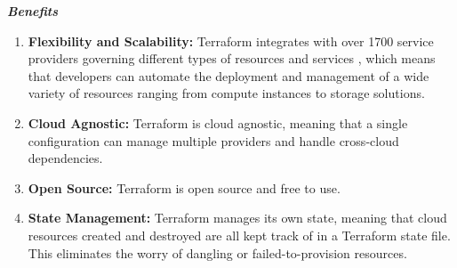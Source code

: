 \textbf{\textit{Benefits}}
\begin{enumerate}
\vspace{-1em}
    \item \textbf{Flexibility and Scalability:} Terraform integrates with over 1700 service providers governing different types of resources and services \cite{cloud-2023}, which means that developers can automate the deployment and management of a wide variety of resources ranging from compute instances to storage solutions.
    \item \textbf{Cloud Agnostic:} Terraform is cloud agnostic, meaning that a single configuration can manage multiple providers and handle cross-cloud dependencies.
    \item \textbf{Open Source:} Terraform is open source and free to use.
    \item \textbf{State Management:} Terraform manages its own state, meaning that cloud resources created and destroyed are all kept track of in a Terraform state file. This eliminates the worry of dangling or failed-to-provision resources.
\end{enumerate}

